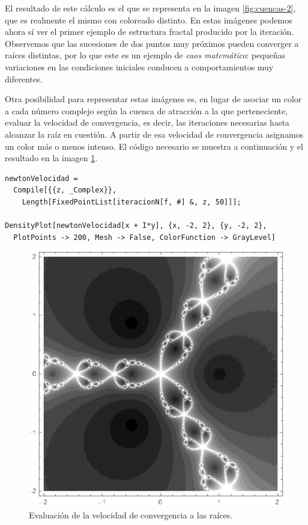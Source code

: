El resultado de este cálculo es el que se representa en la imagen \ref{fig:cuencas-2}, que es realmente el mismo con coloreado distinto. En estas imágenes podemos ahora sí ver el primer ejemplo de estructura fractal producido por la iteración. Observemos que las sucesiones de dos puntos muy próximos pueden converger a raíces distintas, por lo que este es un ejemplo de \textit{caos matemático}: pequeñas variaciones en las condiciones iniciales conducen a comportamientos muy diferentes.

Otra posibilidad para representar estas imágenes es, en lugar de asociar un color a cada número complejo según la cuenca de atracción a la que perteneciente, evaluar la velocidad de convergencia, es decir, las iteraciones necesarias hasta alcanzar la raíz en cuestión. A partir de esa velocidad de convergencia asignamos un color más o menos intenso. El código necesario se muestra a continuación y el resultado en la imagen \ref{fig:cuencas-velocidad}.

\begin{verbatim}
newtonVelocidad = 
  Compile[{{z, _Complex}}, 
    Length[FixedPointList[iteracionN[f, #] &, z, 50]]];

DensityPlot[newtonVelocidad[x + I*y], {x, -2, 2}, {y, -2, 2}, 
  PlotPoints -> 200, Mesh -> False, ColorFunction -> GrayLevel]
\end{verbatim}

\begin{figure} [h]
\centering
\includegraphics[scale = 0.5]{img/cuencas-velocidad.png}
\caption{Evaluación de la velocidad de convergencia a las raíces.}
    \label{fig:cuencas-velocidad}
\end{figure}

